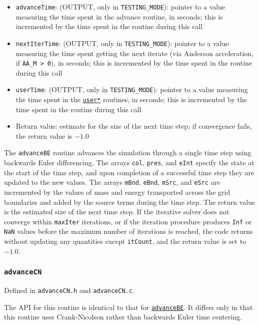 \documentclass[12pt]{article}
\begin{document}
\begin{itemize}
\item \texttt{advanceTime}: (OUTPUT, only in \verb=TESTING_MODE=): pointer to a value measuring the time spent in the advance routine, in seconds; this is incremented by the time spent in the routine during this call
\item \texttt{nextIterTime}: (OUTPUT, only in \verb=TESTING_MODE=): pointer to a value measuring the time spent getting the next iterate (via Anderson acceleration, if \verb=AA_M > 0=), in seconds; this is incremented by the time spent in the routine during this call
\item \texttt{userTime}: (OUTPUT, only in \verb=TESTING_MODE=): pointer to a value measuring the time spent in the \hyperref[ssec:userFunc]{\texttt{user*}} routines, in seconds; this is incremented by the time spent in the routine during this call
\item Return value: estimate for the size of the next time step; if convergence fails, the return value is $-1.0$
\end{itemize}

The \texttt{advanceBE} routine advances the simulation through a single time step using backwards Euler differencing. The arrays \verb=col=, \verb=pres=, and \verb=eInt= specify the state at the start of the time step, and upon completion of a successful time step they are updated to the new values. The arrays \verb=mBnd=, \verb=eBnd=, \verb=mSrc=, and \verb=eSrc= are incremented by the values of mass and energy transported across the grid boundaries and added by the source terms during the time step. The return value is the estimated size of the next time step. If the iterative solver does not converge within \verb=maxIter= iterations, or if the iteration procedure produces \verb=Inf= or \verb=NaN= values before the maximum number of iterations is reached, the code returns without updating any quantities except \verb=itCount=, and the return value is set to $-1.0$.

\subsubsection{\texttt{advanceCN}}
\label{sssec:advanceCN}

Defined in \texttt{advanceCN.h} and \texttt{advanceCN.c}.

The API for this routine is identical to that for \hyperref[sssec:advanceBE]{\texttt{advanceBE}}. It differs only in that this routine uses Crank-Nicolson rather than backwards Euler time centering.
\end{document}
